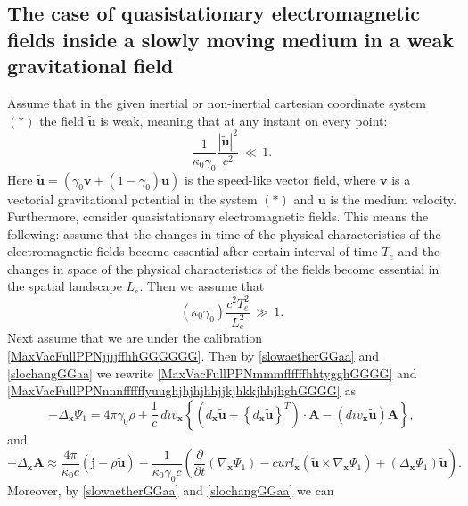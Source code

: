 \documentclass{article}
\theoremstyle{definition}
\theoremstyle{remark}
\renewcommand{\vec}[1]{\mathbf{#1}}
\newcommand{\er}{\eqref}
\newcommand{\er}{\eqref}
\begin{document}
\subsection{The case of quasistationary electromagnetic fields inside a slowly moving medium in a weak gravitational
field}\label{qfCM} Assume that in the given inertial or non-inertial
cartesian coordinate system $(*)$ the field $\vec {\tilde u}$ is
weak, meaning that at any instant on every point:
\begin{equation}\label{slowaetherGGaa}
\frac{1}{\kappa_0\gamma_0}\frac{|\vec {\tilde u}|^2}{c^2}\,\ll\, 1.
\end{equation}
Here $\vec {\tilde u}=\left(\gamma_0\vec v+(1-\gamma_0)\vec
u\right)$ is the speed-like vector field, where $\vec v$ is a
vectorial gravitational potential in the system $(*)$ and $\vec u$
is the medium velocity. Furthermore, consider quasistationary
electromagnetic fields. This means the following: assume that the
changes in time of the physical characteristics of the
electromagnetic fields become essential after certain interval of
time $T_e$ and the changes in space of the physical characteristics
of the fields become essential in the spatial landscape $L_e$. Then
we assume that
\begin{equation}\label{slochangGGaa}
(\kappa_0\gamma_0)\frac{c^2T^2_e}{L^2_e}\,\gg\, 1.
\end{equation}
Next assume that we are under the calibration
\er{MaxVacFullPPNjjjjffhhGGGGGG}. Then by \er{slowaetherGGaa} and
\er{slochangGGaa} we rewrite \er{MaxVacFullPPNmmmffffffhhtygghGGGG}
and \er{MaxVacFullPPNnnnffffffyuughjhjhjhhjjkjhkkjhhjhghGGGG} as
\begin{equation}\label{MaxVacFullPPNmmmffffffhhtygghGGGGaa}
-\Delta_{\vec x}\Psi_1=4\pi\gamma_0\rho+\frac{1}{c}\,div_{\vec x}
\left\{\left(d_{\vec x}\vec {\tilde u}+\left\{d_{\vec x}\vec {\tilde
u}\right\}^T\right)\cdot\vec A-\left(div_{\vec x}\vec {\tilde
u}\right)\vec A\right\},
\end{equation}
and
\begin{equation}\label{MaxVacFullPPNnnnffffffyuughjhjhjhhjjkjhkkjhhjhghGGGGaa1}
-\Delta_{\vec x}\vec A\approx \frac{4\pi}{\kappa_0 c}\left(\vec
j-\rho\vec {\tilde u}\right)-\frac{1}{\kappa_0\gamma_0
c}\left(\frac{\partial}{\partial t}\left(\nabla_{\vec
x}\Psi_1\right)-curl_{\vec x}\left(\vec {\tilde u}\times\nabla_{\vec
x}\Psi_1\right)+\left(\Delta_{\vec x}\Psi_1\right)\vec {\tilde
u}\right).
%
%
%
\end{equation}
Moreover, by \er{slowaetherGGaa} and \er{slochangGGaa} we can
\end{document}
